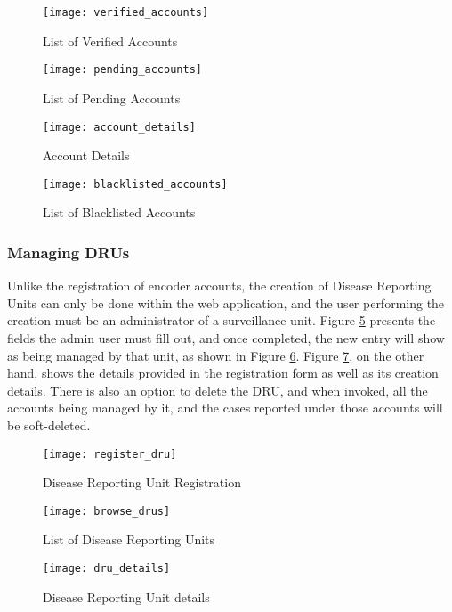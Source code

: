 \begin{figure}[H]
	\centering
	\texttt{[image: verified\_accounts]}
	\caption{List of Verified Accounts}
	\label{fig:verified_accounts}
\end{figure}
\begin{figure}[H]
	\centering
	\texttt{[image: pending\_accounts]}
	\caption{List of Pending Accounts}
	\label{fig:pending_accounts}
\end{figure}
\begin{figure}[H]
	\centering
	\texttt{[image: account\_details]}
	\caption{Account Details}
	\label{fig:account_details}
\end{figure}
\begin{figure}[H]
	\centering
	\texttt{[image: blacklisted\_accounts]}
	\caption{List of Blacklisted Accounts}
	\label{fig:blacklisted_accounts}
\end{figure}

\subsubsection{Managing DRUs}

Unlike the registration of encoder accounts, the creation of Disease Reporting Units can only be done within the web application, and the user performing the creation must be an administrator of a surveillance unit. Figure \ref{fig:register_dru} presents the fields the admin user must fill out, and once completed, the new entry will show as being managed by that unit, as shown in Figure \ref{fig:browse_drus}. Figure \ref{fig:dru_details}, on the other hand, shows the details provided in the registration form as well as its creation details. There is also an option to delete the DRU, and when invoked, all the accounts being managed by it, and the cases reported under those accounts will be soft-deleted.

\begin{figure}[H]
	\centering
	\texttt{[image: register\_dru]}
	\caption{Disease Reporting Unit Registration}
	\label{fig:register_dru}
\end{figure}
\begin{figure}[H]
	\centering
	\texttt{[image: browse\_drus]}
	\caption{List of Disease Reporting Units}
	\label{fig:browse_drus}
\end{figure}
\begin{figure}[H]
	\centering
	\texttt{[image: dru\_details]}
	\caption{Disease Reporting Unit details}
	\label{fig:dru_details}
\end{figure}


